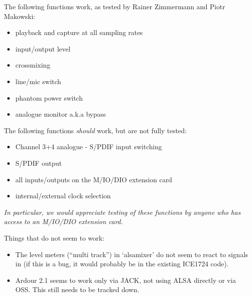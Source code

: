 \documentclass[a4paper,8pt,english]{sphinxmanual}
\begin{document}
The following functions work, as tested by Rainer Zimmermann and Piotr Makowski:
\begin{itemize}
\item {} 
playback and capture at all sampling rates

\item {} 
input/output level

\item {} 
crossmixing

\item {} 
line/mic switch

\item {} 
phantom power switch

\item {} 
analogue monitor a.k.a bypass

\end{itemize}

The following functions \emph{should} work, but are not fully tested:
\begin{itemize}
\item {} 
Channel 3+4 analogue - S/PDIF input switching

\item {} 
S/PDIF output

\item {} 
all inputs/outputs on the M/IO/DIO extension card

\item {} 
internal/external clock selection

\end{itemize}

\emph{In particular, we would appreciate testing of these functions by anyone who has access to an M/IO/DIO extension card.}

Things that do not seem to work:
\begin{itemize}
\item {} 
The level meters (``multi track'') in `alsamixer' do not seem to react to signals in (if this is a bug, it would probably be in the existing ICE1724 code).

\item {} 
Ardour 2.1 seems to work only via JACK, not using ALSA directly or via OSS. This still needs to be tracked down.

\end{itemize}
\end{document}
